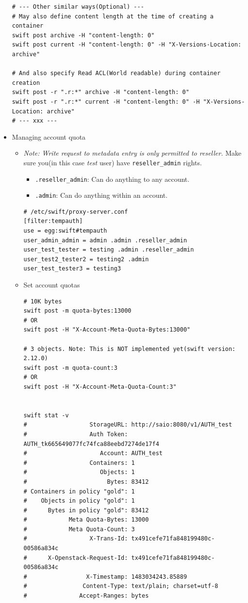 \documentclass{article}
\begin{document}
\begin{itemize}
\begin{verbatim}
# --- Other similar ways(Optional) ---
# May also define content length at the time of creating a container
swift post archive -H "content-length: 0"
swift post current -H "content-length: 0" -H "X-Versions-Location: archive"

# And also specify Read ACL(World readable) during container creation
swift post -r ".r:*" archive -H "content-length: 0"
swift post -r ".r:*" current -H "content-length: 0" -H "X-Versions-Location: archive"
# --- xxx ---
\end{verbatim}

\item Managing account quota

\begin{itemize}
\item \emph{Note: Write request to metadata entry is only permitted to
reseller.} Make sure you(in this case \emph{test} user) have
\texttt{reseller\_admin} rights.

\begin{itemize}
\item \texttt{.reseller\_admin}: Can do anything to any account.
\item \texttt{.admin}: Can do anything within an account.
\end{itemize}

\begin{verbatim}
# /etc/swift/proxy-server.conf
[filter:tempauth]
use = egg:swift#tempauth
user_admin_admin = admin .admin .reseller_admin
user_test_tester = testing .admin .reseller_admin
user_test2_tester2 = testing2 .admin
user_test_tester3 = testing3
\end{verbatim}

\item Set account quotas

\begin{verbatim}
# 10K bytes
swift post -m quota-bytes:13000
# OR
swift post -H "X-Account-Meta-Quota-Bytes:13000"

# 3 objects. Note: This is NOT implemented yet(swift version: 2.12.0)
swift post -m quota-count:3
# OR
swift post -H "X-Account-Meta-Quota-Count:3"


swift stat -v
#                  StorageURL: http://saio:8080/v1/AUTH_test
#                  Auth Token: AUTH_tk665649077fc74fca88eebd7274de17f4
#                     Account: AUTH_test
#                  Containers: 1
#                     Objects: 1
#                       Bytes: 83412
# Containers in policy "gold": 1
#    Objects in policy "gold": 1
#      Bytes in policy "gold": 83412
#            Meta Quota-Bytes: 13000
#            Meta Quota-Count: 3
#                  X-Trans-Id: tx491cefe71fa848199480c-00586a834c
#      X-Openstack-Request-Id: tx491cefe71fa848199480c-00586a834c
#                 X-Timestamp: 1483034243.85889
#                Content-Type: text/plain; charset=utf-8
#               Accept-Ranges: bytes



\end{verbatim}
\end{itemize}
\end{itemize}
\end{document}
